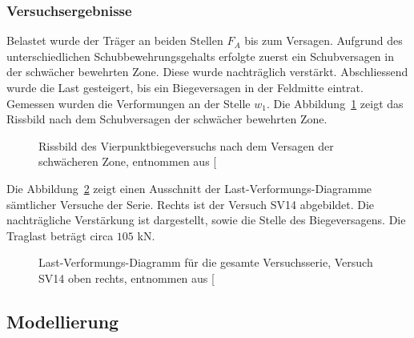 \documentclass[
  11pt,
  letterpaper,
]{scrreprt}
\begin{document}
\subsubsection{Versuchsergebnisse}\label{versuchsergebnisse-1}

Belastet wurde der Träger an beiden Stellen \(F_A\) bis zum Versagen.
Aufgrund des unterschiedlichen Schubbewehrungsgehalts erfolgte zuerst
ein Schubversagen in der schwächer bewehrten Zone. Diese wurde
nachträglich verstärkt. Abschliessend wurde die Last gesteigert, bis ein
Biegeversagen in der Feldmitte eintrat. Gemessen wurden die Verformungen
an der Stelle \(w_1\). Die Abbildung~\ref{fig-sv14_versuchsres_1} zeigt
das Rissbild nach dem Schubversagen der schwächer bewehrten Zone.

\begin{figure}[H]


\caption{\label{fig-sv14_versuchsres_1}Rissbild des
Vierpunktbiegeversuchs nach dem Versagen der schwächeren Zone, entnommen
aus {[}\citeproc{ref-tue_einfluss_2019}{3}{]}}

\end{figure}%

Die Abbildung~\ref{fig-sv14_versuchsres_2} zeigt einen Ausschnitt der
Last-Verformungs-Diagramme sämtlicher Versuche der Serie. Rechts ist der
Versuch SV14 abgebildet. Die nachträgliche Verstärkung ist dargestellt,
sowie die Stelle des Biegeversagens. Die Traglast beträgt circa \(105\)
kN.

\begin{figure}[H]


\caption{\label{fig-sv14_versuchsres_2}Last-Verformungs-Diagramm für die
gesamte Versuchsserie, Versuch SV14 oben rechts, entnommen aus
{[}\citeproc{ref-tue_einfluss_2019}{3}{]}}

\end{figure}%

\subsection{Modellierung}\label{modellierung-1}
\end{document}
